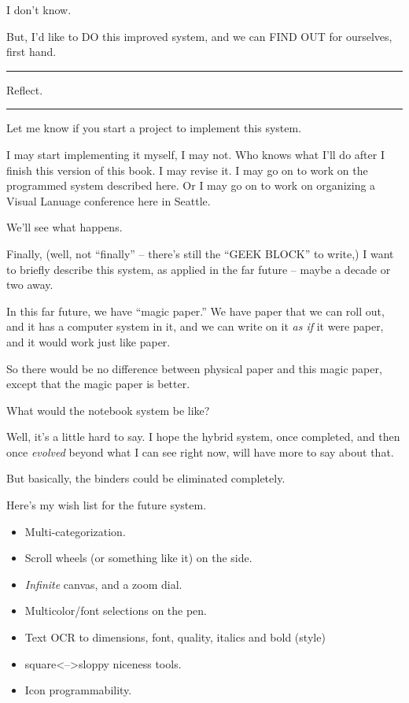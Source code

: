 \documentclass[oneside]{scrbook}
\newcommand\pause{\bigskip\noindent}
\begin{document}
I don't know.

But, I'd like to DO this improved system, and we can FIND OUT for
ourselves, first hand.

\pause
\hrule

Reflect.

\hrule
\pause

Let me know if you start a project to implement this system.

I may start implementing it myself, I may not. Who knows what I'll do
after I finish this version of this book. I may revise it. I may go on
to work on the programmed system described here. Or I may go on to
work on organizing a Visual Lanuage conference here in Seattle.

We'll see what happens.

Finally, (well, not ``finally'' -- there's still the ``GEEK BLOCK'' to
write,) I want to briefly describe this system, as applied in the far
future -- maybe a decade or two away.

In this far future, we have ``magic paper.'' We have paper that we can
roll out, and it has a computer system in it, and we can write on it
\emph{as if} it were paper, and it would work just like paper.

So there would be no difference between physical paper and this magic
paper, except that the magic paper is better.

What would the notebook system be like?

Well, it's a little hard to say. I hope the hybrid system, once
completed, and then once \emph{evolved} beyond what I can see right now,
will have more to say about that.

But basically, the binders could be eliminated completely.

Here's my wish list for the future system.

\begin{itemize}
\item Multi-categorization.
\item Scroll wheels (or something like it) on the side.
\item \emph{Infinite} canvas, and a zoom dial.
\item Multicolor/font selections on the pen.
\item Text OCR to dimensions, font, quality, italics and bold (style)
\item square<-->sloppy niceness tools.
\item Icon programmability.
\end{itemize}
\end{document}

